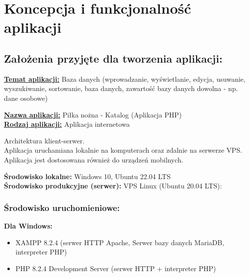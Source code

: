 \section{Koncepcja i funkcjonalność aplikacji}

\subsection{Założenia przyjęte dla tworzenia aplikacji:}
    \begin{flushleft}

        \underline{\textbf{Temat aplikacji:}} Baza danych (wprowadzanie, wyświetlanie, edycja, usuwanie, wyszukiwanie, sortowanie, baza danych, zawartość bazy danych dowolna - np. dane osobowe) \newline\newline

        \underline{\textbf{Nazwa aplikacji:}} Piłka nożna - Katalog (Aplikacja PHP) \\
        \underline{\textbf{Rodzaj aplikacji:}} Aplikacja internetowa \newline\newline

        Architektura klient-serwer. \\
        Aplikacja uruchamiana lokalnie na komputerach oraz zdalnie na serwerze VPS. \\
        Aplikacja jest dostosowana również do urządzeń mobilnych. \newline\newline

        \textbf{Środowisko lokalne:} Windows 10, Ubuntu 22.04 LTS \\
        \textbf{Środowisko produkcyjne (serwer):} VPS Linux (Ubuntu 20.04 LTS): \\ 

        \subsubsection{Środowisko uruchomieniowe:}

        \textbf{Dla Windows:}
        \begin{itemize}
            \item XAMPP 8.2.4 (serwer HTTP Apache, Serwer bazy danych MariaDB, interpreter PHP)
            \item PHP 8.2.4 Development Server (serwer HTTP + interpreter PHP)
        \end{itemize}
            

\end{flushleft}
